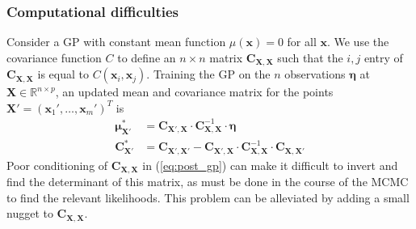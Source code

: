 \documentclass{article}
\begin{document}

\subsubsection{Computational difficulties}
Consider a GP with constant mean function $\mu(\mathbf x)=0$ for all $\mathbf x$. 
%
We use the covariance function $C$ to define an $n\times n$ matrix $\mathbf C_{\mathbf X,\mathbf X}$ such that the $i,j$ entry of $\mathbf C_{\mathbf X,\mathbf X}$ is equal to $C(\mathbf x_i,\mathbf x_j)$. 
%
Training the GP on the $n$ observations $\boldsymbol \eta$ at $\mathbf X\in \mathbb R^{n\times p}$, an updated mean and covariance matrix for the points $\mathbf X'=(\mathbf x_1',\ldots,\mathbf x_m')^T$ is 
%
\begin{equation}\label{eq:post_gp}\begin{split}
\boldsymbol\mu^*_{\mathbf X'}&=\mathbf C_{\mathbf X',\mathbf X}\cdot \mathbf C_{\mathbf X,\mathbf X} ^{-1}\cdot \boldsymbol \eta
\\
\mathbf C^*_{\mathbf X'}&=\mathbf C_{\mathbf X',\mathbf X'}-\mathbf C_{\mathbf X',\mathbf X}\cdot \mathbf C_{\mathbf X,\mathbf X}^{-1}\cdot \mathbf C_{\mathbf X,\mathbf X'}
\end{split}\end{equation}
%
%
Poor conditioning of $\mathbf C_{\mathbf X,\mathbf X}$ in (\ref{eq:post_gp}) can make it difficult to invert and find the determinant of this matrix, as must be done in the course of the MCMC to find the relevant likelihoods.
%
This problem can be alleviated by adding a small nugget to $\mathbf C_{\mathbf X,\mathbf X}$. 
\end{document}
